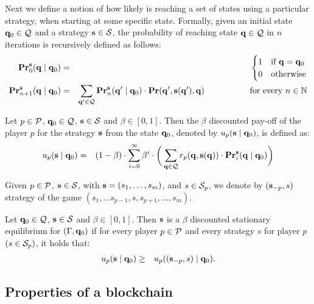
Next we define a notion of how likely is reaching a set of states using a particular strategy, when starting at some specific state.
Formally, given an initial state $\mathbf{q}_0 \in \mathcal{Q}$ and a strategy $\mathbf{s} \in \mathcal{S}$, 
the probability of reaching state $\mathbf{q} \in \mathcal{Q}$ in $n$ iterations is recursively defined as follows:
\begin{eqnarray*}
\mathbf{Pr}_0^{\mathbf{s}}(\mathbf{q} \mid \mathbf{q}_0) & = &
\begin{cases}
1 & \text{if } \mathbf{q} = \mathbf{q}_0\\
0 & \text{otherwise}
\end{cases}\\
\mathbf{Pr}_{n+1}^{\mathbf{s}}(\mathbf{q} \mid \mathbf{q}_0) & = & \sum_{\mathbf{q}' \in \mathcal{Q}} \mathbf{Pr}_n^{\mathbf{s}}(\mathbf{q}'\mid \mathbf{q}_0) \cdot \mathbf{Pr}(\mathbf{q}', \mathbf{s}(\mathbf{q}'), \mathbf{q}) \quad \quad \quad  \quad \quad \text{ for every } n \in \mathbb{N}
\end{eqnarray*}


\begin{mydef}
Let $p \in \mathcal{P}$, $\mathbf{q}_0 \in \mathcal{Q}$, $\mathbf{s} \in \mathcal{S}$ and $\beta \in [0,1]$. Then the $\beta$ discounted pay-off of the player $p$ for the strategy $\mathbf{s}$ from the state $\mathbf{q}_0$, denoted by $u_p(\mathbf{s} \mid \mathbf{q}_0)$, is defined as:
\begin{eqnarray*}
u_p(\mathbf{s} \mid \mathbf{q}_0) & = & (1 - \beta) \cdot \sum_{i=0}^{\infty}\beta^{i} \cdot  \bigg(\sum_{\mathbf{q} \in \mathcal{Q}} r_p(\mathbf{q},\mathbf{s}(\mathbf{q})) \cdot 
\mathbf{Pr}_i^{\mathbf{s}}(\mathbf{q} \mid \mathbf{q}_0)\bigg)
\end{eqnarray*}
\end{mydef}


Given $p \in \mathcal{P}$, $\mathbf{s} \in \mathcal{S}$, with $\mathbf{s} = (s_1, \ldots, s_m)$, and $s \in \mathcal{S}_p$, we denote by $(\mathbf{s}_{-p}, s)$ strategy of the game $(s_1, \ldots s_{p-1},s,s_{p+1}, \ldots, s_{m})$.
\begin{mydef}
Let $\mathbf{q}_0 \in \mathcal{Q}$, $\mathbf{s} \in \mathcal{S}$ and $\beta \in [0,1]$. Then $\mathbf{s}$ is a $\beta$ discounted stationary equilibrium for $(\Gamma, \mathbf{q}_0)$ if for every player $p \in \mathcal{P}$ and every strategy $s$ for player $p$ $(s \in\mathcal{S}_p)$, it holds that:
\begin{eqnarray*}
u_p(\mathbf{s} \mid \mathbf{q}_0)  & \geq  & u_p ((\mathbf{s}_{-p},s) \mid \mathbf{q}_0).
\end{eqnarray*}
\end{mydef}

\subsection{Properties of a blockchain}

